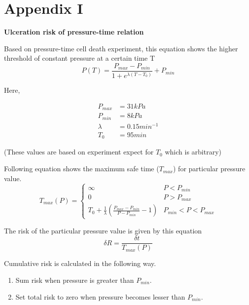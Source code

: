 \chapter*{Appendix I}
\label{chapter:appendix1}

\textbf{Ulceration risk of pressure-time relation}

Based on pressure-time cell death experiment, this equation shows the higher threshold of constant pressure at a certain time T
\begin{equation}
    P(T) = \frac{P_{max}-P_{min}}{1 + e^{\lambda(T-T_0)}} + P_{min}
\end{equation}

Here,

\begin{align*}
    P_{max} &= 31 kPa\\
    P_{min} &= 8 kPa\\
    \lambda &= 0.15 min^{-1}\\
    T_0     &= 95 min
\end{align*}

(These values are based on experiment expect for $T_0$ which is arbitrary)

Following equation shows the maximum safe time ($T_{max}$) for particular pressure value.  
\begin{equation}
    T_{max}(P) = 
    \begin{cases}
        \infty & P < P_{min}\\
        0  & P > P_{max}\\
        T_0 + \frac{1}{\lambda}\left( \frac{P_{max}-P_{min}}{P-P_{min}} - 1 \right) & P_{min} < P < P_{max}
    \end{cases}
\end{equation}

The risk of the particular pressure value is given by this equation
\begin{equation}
    \delta R = \frac{\delta t}{T_{max}(P)}
\end{equation}

Cumulative risk is calculated in the following way.

\begin{enumerate}
    \item Sum risk when pressure is greater than $P_{min}$.
    \item Set total risk to zero when pressure becomes lesser than $P_{min}$.
\end{enumerate}

